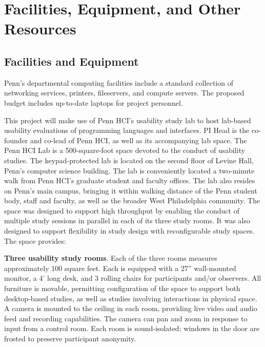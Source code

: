 \section*{Facilities, Equipment, and Other Resources}

\subsection*{Facilities and Equipment}

Penn's departmental computing facilities include a standard collection
of networking services, printers, fileservers, and compute
servers. The proposed budget includes up-to-date laptops for project
personnel.


\smallskip

This project will make use of Penn HCI's usability study lab to host lab-based usability evaluations of programming languages and interfaces. PI Head is the co-founder and co-lead of Penn HCI, as well as its accompanying lab space. The Penn HCI Lab is a 500-square-foot space devoted to the conduct of usability studies. The keypad-protected lab is located on the second floor of Levine Hall, Penn's computer science building. The lab is conveniently located a two-minute walk from Penn HCI's graduate student and faculty offices. The lab also resides on Penn's main campus, bringing it within walking distance of the Penn student body, staff and faculty, as well as the broader West Philadelphia community. The space was designed to support high throughput by enabling the conduct of multiple study sessions in parallel in each of its three study rooms. It was also designed to support flexibility in study design with reconfigurable study spaces. The space provides:

\textbf{Three usability study rooms}. Each of the three rooms measures approximately 100 square feet. Each is equipped with a 27'' wall-mounted monitor, a 4' long desk, and 3 rolling chairs for participants and/or observers. All furniture is movable, permitting configuration of the space to support both desktop-based studies, as well as studies involving interactions in physical space. A camera is mounted to the ceiling in each room, providing live video and audio feed and recording capabilities. The camera can pan and zoom in response to input from a control room. Each room is sound-isolated; windows in the door are frosted to preserve participant anonymity.

